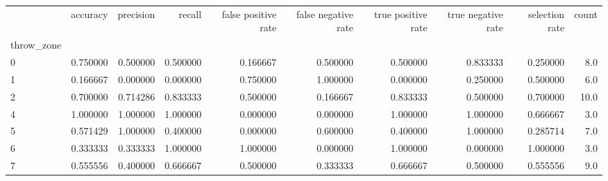 \begin{tabular}{lrrrrrrrrr}
\toprule
{} &  accuracy &  precision &    recall &  false positive rate &  false negative rate &  true positive rate &  true negative rate &  selection rate &  count \\
throw\_zone &           &            &           &                      &                      &                     &                     &                 &        \\
\midrule
0          &  0.750000 &   0.500000 &  0.500000 &             0.166667 &             0.500000 &            0.500000 &            0.833333 &        0.250000 &    8.0 \\
1          &  0.166667 &   0.000000 &  0.000000 &             0.750000 &             1.000000 &            0.000000 &            0.250000 &        0.500000 &    6.0 \\
2          &  0.700000 &   0.714286 &  0.833333 &             0.500000 &             0.166667 &            0.833333 &            0.500000 &        0.700000 &   10.0 \\
4          &  1.000000 &   1.000000 &  1.000000 &             0.000000 &             0.000000 &            1.000000 &            1.000000 &        0.666667 &    3.0 \\
5          &  0.571429 &   1.000000 &  0.400000 &             0.000000 &             0.600000 &            0.400000 &            1.000000 &        0.285714 &    7.0 \\
6          &  0.333333 &   0.333333 &  1.000000 &             1.000000 &             0.000000 &            1.000000 &            0.000000 &        1.000000 &    3.0 \\
7          &  0.555556 &   0.400000 &  0.666667 &             0.500000 &             0.333333 &            0.666667 &            0.500000 &        0.555556 &    9.0 \\
\bottomrule
\end{tabular}
